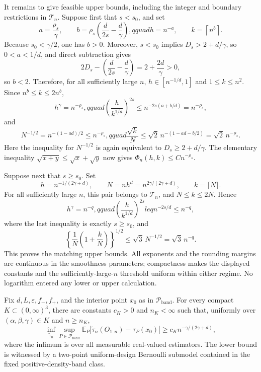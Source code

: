It remains to give feasible upper bounds, including the integer and boundary restrictions in \(\mathcal T_n\).  Suppose first that \(s<s_0\), and set
\[
 a=\frac{\rho_s}{\gamma},\qquad
 b=\rho_s\left(\frac{d}{2s}-\frac{d}{\gamma}\right),qquad
 h=n^{-a},\qquad k=\left\lceil n^b\right\rceil.
\]
Because \(s_0<\gamma/2\), one has \(b>0\).  Moreover, \(s<s_0\) implies \(D_s>2+d/\gamma\), so \(0<a<1/d\), and direct subtraction gives
\[
 2D_s-\left(\frac{d}{2s}-\frac{d}{\gamma}\right)=2+\frac{2d}{\gamma}>0,
\]
so \(b<2\).  Therefore, for all sufficiently large \(n\), \(h\in[n^{-1/d},1]\) and \(1\leq k\leq n^2\).  Since \(n^b\leq k\leq2n^b\),
\[
 h^\gamma=n^{-\rho_s},qquad
 \left(\frac{h}{k^{1/d}}\right)^{2s}\leq n^{-2s(a+b/d)}=n^{-\rho_s},
\]
and
\[
 N^{-1/2}=n^{-(1-ad)/2}\leq n^{-\rho_s},qquad
 \frac{\sqrt{k}}{N}\leq\sqrt2\,n^{-(1-ad-b/2)}=\sqrt2\,n^{-\rho_s}.
\]
Here the inequality for \(N^{-1/2}\) is again equivalent to \(D_s\geq2+d/\gamma\).  The elementary inequality \(\sqrt{x+y}\leq\sqrt{x}+\sqrt{y}\) now gives \(\Phi_n(h,k)\leq Cn^{-\rho_s}\).

Suppose next that \(s\geq s_0\).  Set
\[
 h=n^{-1/(2\gamma+d)},\qquad N=nh^d=n^{2\gamma/(2\gamma+d)},\qquad k=\lceil N\rceil.
\]
For all sufficiently large \(n\), this pair belongs to \(\mathcal T_n\), and \(N\leq k\leq2N\).  Hence
\[
 h^\gamma=n^{-q},qquad
 \left(\frac{h}{k^{1/d}}\right)^{2s}leq n^{-2s/d}\leq n^{-q},
\]
where the last inequality is exactly \(s\geq s_0\), and
\[
 \left\{\frac1N\left(1+\frac{k}{N}\right)\right\}^{1/2}
 \leq\sqrt{3}\,N^{-1/2}=\sqrt3\,n^{-q}.
\]
This proves the matching upper bounds.  All exponents and the rounding margins are continuous in the smoothness parameters; compactness makes the displayed constants and the sufficiently-large-\(n\) threshold uniform within either regime.  No logarithm entered any lower or upper calculation.

Fix \(d,L,\varepsilon,f_{-},f_{+}\), and the interior point \(x_0\) as in \(\mathcal P_{\mathrm{band}}\).  For every compact \(K\subset(0,\infty)^3\), there are constants \(c_K>0\) and \(n_K<\infty\) such that, uniformly over \((\alpha,\beta,\gamma)\in K\) and \(n\geq n_K\),
\[
 \inf_{\widetilde\tau_n}\sup_{P\in\mathcal P_{\mathrm{band}}}
 \mathbb E_P\left|\widetilde\tau_n(O_{1:n})-\tau_P(x_0)\right|
 \geq c_K n^{-\gamma/(2\gamma+d)},
\]
where the infimum is over all measurable real-valued estimators.  The lower bound is witnessed by a two-point uniform-design Bernoulli submodel contained in the fixed positive-density-band class.

